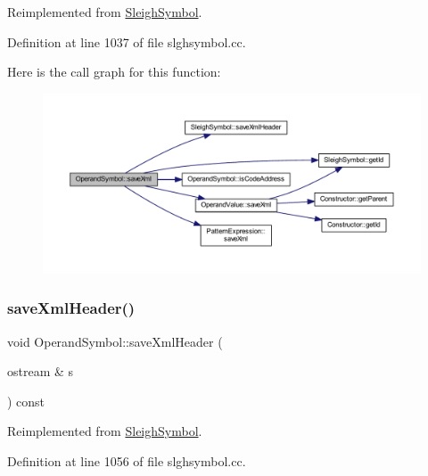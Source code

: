 Reimplemented from \mbox{\hyperlink{class_sleigh_symbol_a83c9a32d16419d2277c5b9d542e1cf13}{Sleigh\+Symbol}}.



Definition at line 1037 of file slghsymbol.\+cc.

Here is the call graph for this function\+:
\nopagebreak
\begin{figure}[H]
\begin{center}
\leavevmode
\includegraphics[width=350pt]{class_operand_symbol_a20b491e8a76d47973fe52df326d9ce38_cgraph}
\end{center}
\end{figure}
\mbox{\label{class_operand_symbol_a9cdbc0cf454ad7ed2b3683100a4a8de0}} 
\subsubsection{\texorpdfstring{saveXmlHeader()}{saveXmlHeader()}}
{\footnotesize\ttfamily void Operand\+Symbol\+::save\+Xml\+Header (\begin{DoxyParamCaption}\item[{ostream \&}]{s }\end{DoxyParamCaption}) const\hspace{0.3cm}{\ttfamily [virtual]}}



Reimplemented from \mbox{\hyperlink{class_sleigh_symbol_ac501be7c584bc0568c29fb95910962e9}{Sleigh\+Symbol}}.



Definition at line 1056 of file slghsymbol.\+cc.

